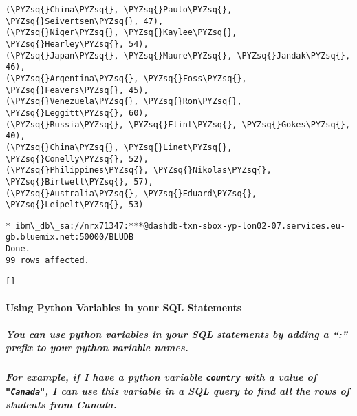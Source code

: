 \documentclass[11pt]{article}
\makeatletter
\def\PYZsq{\textquotesingle}%
\def\PYZsq{\char`\'}
\newcommand{\boxspacing}{\kern\kvtcb@left@rule\kern\kvtcb@boxsep}
\newcommand{\prompt}[4]{
        \ttfamily\llap{{\color{#2}[#3]:\hspace{3pt}#4}}\vspace{-\baselineskip}
    }
\makeatother
\begin{document}
\begin{tcolorbox}[breakable, size=fbox, boxrule=1pt, pad at break*=1mm,colback=cellbackground, colframe=cellborder]
\begin{Verbatim}[commandchars=\\\{\}]
(\PYZsq{}China\PYZsq{}, \PYZsq{}Paulo\PYZsq{}, \PYZsq{}Seivertsen\PYZsq{}, 47),
(\PYZsq{}Niger\PYZsq{}, \PYZsq{}Kaylee\PYZsq{}, \PYZsq{}Hearley\PYZsq{}, 54),
(\PYZsq{}Japan\PYZsq{}, \PYZsq{}Maure\PYZsq{}, \PYZsq{}Jandak\PYZsq{}, 46),
(\PYZsq{}Argentina\PYZsq{}, \PYZsq{}Foss\PYZsq{}, \PYZsq{}Feavers\PYZsq{}, 45),
(\PYZsq{}Venezuela\PYZsq{}, \PYZsq{}Ron\PYZsq{}, \PYZsq{}Leggitt\PYZsq{}, 60),
(\PYZsq{}Russia\PYZsq{}, \PYZsq{}Flint\PYZsq{}, \PYZsq{}Gokes\PYZsq{}, 40),
(\PYZsq{}China\PYZsq{}, \PYZsq{}Linet\PYZsq{}, \PYZsq{}Conelly\PYZsq{}, 52),
(\PYZsq{}Philippines\PYZsq{}, \PYZsq{}Nikolas\PYZsq{}, \PYZsq{}Birtwell\PYZsq{}, 57),
(\PYZsq{}Australia\PYZsq{}, \PYZsq{}Eduard\PYZsq{}, \PYZsq{}Leipelt\PYZsq{}, 53)
\end{Verbatim}
\end{tcolorbox}

    \begin{Verbatim}[commandchars=\\\{\}]
 * ibm\_db\_sa://nrx71347:***@dashdb-txn-sbox-yp-lon02-07.services.eu-
gb.bluemix.net:50000/BLUDB
Done.
99 rows affected.
    \end{Verbatim}

            \begin{tcolorbox}[breakable, size=fbox, boxrule=.5pt, pad at break*=1mm, opacityfill=0]
\prompt{Out}{outcolor}{3}{\boxspacing}
\begin{Verbatim}[commandchars=\\\{\}]
[]
\end{Verbatim}
\end{tcolorbox}
        
    \hypertarget{using-python-variables-in-your-sql-statements}{%
\paragraph{Using Python Variables in your SQL
Statements}\label{using-python-variables-in-your-sql-statements}}

\hypertarget{you-can-use-python-variables-in-your-sql-statements-by-adding-a-prefix-to-your-python-variable-names.}{%
\subparagraph{You can use python variables in your SQL statements by
adding a ``:'' prefix to your python variable
names.}\label{you-can-use-python-variables-in-your-sql-statements-by-adding-a-prefix-to-your-python-variable-names.}}

\hypertarget{for-example-if-i-have-a-python-variable-country-with-a-value-of-canada-i-can-use-this-variable-in-a-sql-query-to-find-all-the-rows-of-students-from-canada.}{%
\subparagraph{\texorpdfstring{For example, if I have a python variable
\texttt{country} with a value of \texttt{"Canada"}, I can use this
variable in a SQL query to find all the rows of students from
Canada.}{For example, if I have a python variable country with a value of "Canada", I can use this variable in a SQL query to find all the rows of students from Canada.}}\label{for-example-if-i-have-a-python-variable-country-with-a-value-of-canada-i-can-use-this-variable-in-a-sql-query-to-find-all-the-rows-of-students-from-canada.}}
\end{document}
